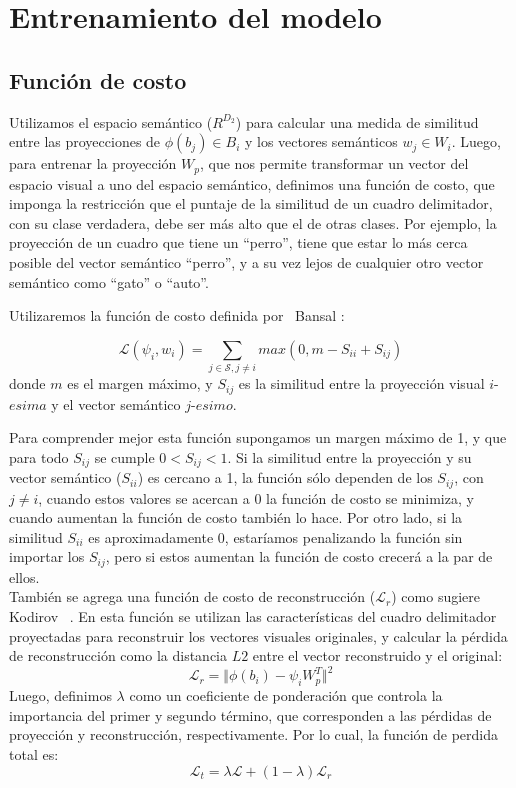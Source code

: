 \section{Entrenamiento del modelo}\label{ssec:entrenamiento}

\subsection{Función de costo}

Utilizamos el espacio semántico (${R}^{D_2}$) para calcular una medida de similitud entre las proyecciones de $\phi(b_j) \in B_i$ y los vectores semánticos $w_j \in W_i$. Luego, para entrenar la proyección $W_p$, que nos permite transformar un vector del espacio visual a uno del espacio semántico, definimos una función de costo, que imponga la restricción que el puntaje de la similitud de un cuadro delimitador, con su clase verdadera, debe ser más alto que el de otras clases. Por ejemplo, la proyección de un cuadro que tiene un ``perro'', tiene que estar lo más cerca posible del vector semántico ``perro'', y a su vez lejos de cualquier otro vector semántico como ``gato'' o ``auto''.

Utilizaremos la función de costo definida por \cite{bansal2018zero}~Bansal \etal: 

\[\mathcal{L}(\psi_i, w_i) = \sum_{j \in \mathcal{S}, j\neq i} max(0, m - S_{ii} + S_{ij})\] 
donde $m$ es el margen máximo, y $S_{ij}$ es la similitud entre la proyección visual $i$-$esima$ y el vector semántico $j$-$esimo$. 

Para comprender mejor esta función supongamos un margen máximo de 1, y que para todo $S_{ij}$ se cumple $0 < S_{ij} < 1$. Si la similitud entre la proyección y su vector semántico ($S_{ii}$) es cercano a 1, la función sólo dependen de los $S_{ij}$, con $j \neq i$, cuando estos valores se acercan a 0 la función de costo se minimiza, y cuando aumentan la función de costo también lo hace. Por otro lado, si la similitud $S_{ii}$ es aproximadamente 0, estaríamos penalizando la función sin importar los $S_{ij}$, pero si estos aumentan la función de costo crecerá a la par de ellos. \\


También se agrega una función de costo de reconstrucción ($\mathcal{L}_r$) como sugiere Kodirov \etal~\cite{kodirov2017semantic}. En esta función se utilizan las características del cuadro delimitador proyectadas para reconstruir los vectores visuales originales, y calcular la pérdida de reconstrucción como la distancia $L2$  entre el vector reconstruido y el original:
\[\mathcal{L}_r = \Vert{\phi(b_i) - \psi_iW_p^T}\Vert^2 \] 
Luego, definimos $\lambda$ como un coeficiente de ponderación que controla la importancia del primer y segundo término, que corresponden a las pérdidas de proyección y reconstrucción, respectivamente. Por lo cual, la función de perdida total es: 
\[\mathcal{L}_t = \lambda \mathcal{L} + (1-\lambda) \mathcal{L}_r \]

